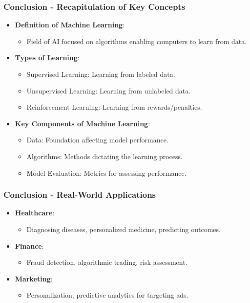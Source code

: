 \documentclass[aspectratio=169]{beamer}
\begin{document}
\begin{frame}[fragile]
    \frametitle{Conclusion - Recapitulation of Key Concepts}
    \begin{itemize}
        \item \textbf{Definition of Machine Learning}:
        \begin{itemize}
            \item Field of AI focused on algorithms enabling computers to learn from data.
        \end{itemize}
        \item \textbf{Types of Learning}:
        \begin{itemize}
            \item Supervised Learning: Learning from labeled data.
            \item Unsupervised Learning: Learning from unlabeled data.
            \item Reinforcement Learning: Learning from rewards/penalties.
        \end{itemize}
        \item \textbf{Key Components of Machine Learning}:
        \begin{itemize}
            \item Data: Foundation affecting model performance.
            \item Algorithms: Methods dictating the learning process.
            \item Model Evaluation: Metrics for assessing performance.
        \end{itemize}
    \end{itemize}
\end{frame}

\begin{frame}[fragile]
    \frametitle{Conclusion - Real-World Applications}
    \begin{itemize}
        \item \textbf{Healthcare}:
        \begin{itemize}
            \item Diagnosing diseases, personalized medicine, predicting outcomes.
        \end{itemize}
        \item \textbf{Finance}:
        \begin{itemize}
            \item Fraud detection, algorithmic trading, risk assessment.
        \end{itemize}
        \item \textbf{Marketing}:
        \begin{itemize}
            \item Personalization, predictive analytics for targeting ads.
        \end{itemize}
    \end{itemize}
\end{frame}
\end{document}

